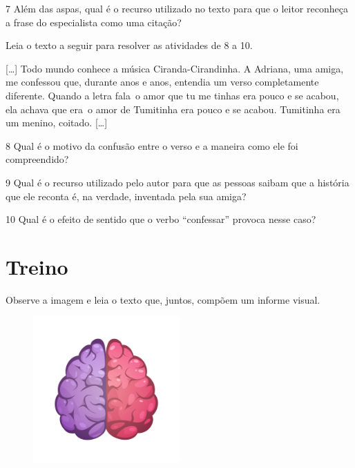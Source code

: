 \num{7} Além das aspas, qual é o recurso utilizado no texto para que o
leitor reconheça a frase do especialista como uma citação?


Leia o texto a seguir para resolver as atividades de 8 a 10.

\begin{myquote}
{[}\ldots{]} Todo mundo conhece a música Ciranda-Cirandinha. A Adriana,
uma amiga, me confessou que, durante anos e anos, entendia um verso
completamente diferente. Quando a letra fala~o amor que tu me tinhas era
pouco e se acabou, ela achava que era~o amor de Tumitinha era pouco e se
acabou. Tumitinha era um menino, coitado. {[}\ldots{]}

\end{myquote}

\num{8} Qual é o motivo da confusão entre o verso e a maneira como ele
foi compreendido?


\num{9} Qual é o recurso utilizado pelo autor para que as pessoas saibam
que a história que ele reconta é, na verdade, inventada pela sua amiga?


\num{10} Qual é o efeito de sentido que o verbo ``confessar'' provoca
nesse caso?


\section*{Treino}

Observe a imagem e leia o texto que, juntos, compõem um informe
visual.

\begin{figure}[H]
\centering\includegraphics[width=0.5\textwidth]{./imgSAEB_6_POR/freepik/PORT_6_IMG-19.jpeg}
\end{figure}

